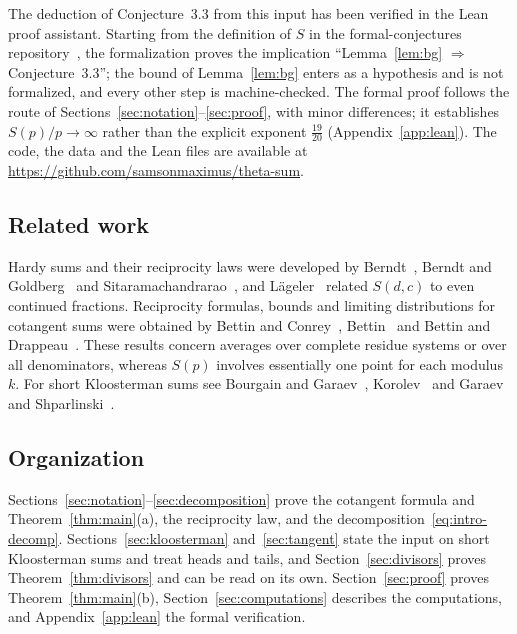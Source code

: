 The deduction of Conjecture~3.3 from this input has been verified in the Lean proof assistant. Starting from the definition of $S$ in the formal-conjectures repository~\cite{b11}, the formalization proves the implication ``Lemma~\ref{lem:bg} $\Rightarrow$ Conjecture~3.3''; the bound of Lemma~\ref{lem:bg} enters as a hypothesis and is not formalized, and every other step is machine-checked. The formal proof follows the route of Sections~\ref{sec:notation}--\ref{sec:proof}, with minor differences; it establishes $S(p)/p\to\infty$ rather than the explicit exponent $\frac{19}{20}$ (Appendix~\ref{app:lean}). The code, the data and the Lean files are available at \url{https://github.com/samsonmaximus/theta-sum}.

\subsection{Related work}
Hardy sums and their reciprocity laws were developed by Berndt~\cite{b2}, Berndt and Goldberg~\cite{b3} and Sitaramachandrarao~\cite{b26}, and L\"ageler~\cite{b18} related $S(d,c)$ to even continued fractions. Reciprocity formulas, bounds and limiting distributions for cotangent sums were obtained by Bettin and Conrey~\cite{b5}, Bettin~\cite{b4} and Bettin and Drappeau~\cite{b6,b7}. These results concern averages over complete residue systems or over all denominators, whereas $S(p)$ involves essentially one point for each modulus $k$. For short Kloosterman sums see Bourgain and Garaev~\cite{b8,b9}, Korolev~\cite{b17} and Garaev and Shparlinski~\cite{b12}.

\subsection{Organization}
Sections~\ref{sec:notation}--\ref{sec:decomposition} prove the cotangent formula and Theorem~\ref{thm:main}(a), the reciprocity law, and the decomposition~\eqref{eq:intro-decomp}. Sections~\ref{sec:kloosterman} and~\ref{sec:tangent} state the input on short Kloosterman sums and treat heads and tails, and Section~\ref{sec:divisors} proves Theorem~\ref{thm:divisors} and can be read on its own. Section~\ref{sec:proof} proves Theorem~\ref{thm:main}(b), Section~\ref{sec:computations} describes the computations, and Appendix~\ref{app:lean} the formal verification.
